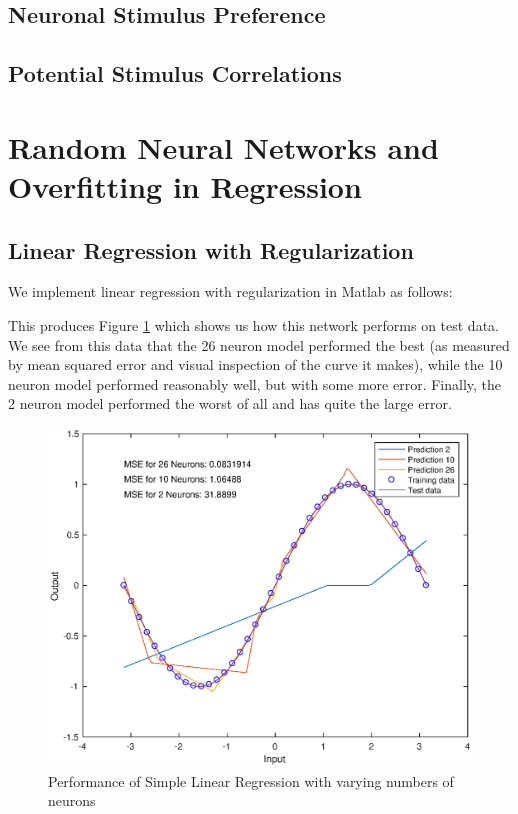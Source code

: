\documentclass[11pt, oneside]{article}
\begin{document}
\subsection{Neuronal Stimulus Preference}

\subsection{Potential Stimulus Correlations}

\section{Random Neural Networks and Overfitting in Regression}

\subsection{Linear Regression with Regularization}

We implement linear regression with regularization in Matlab as follows:

This produces Figure \ref{fig:regression} which shows us how this network performs on test data. We see from this data that the 26 neuron model performed the best (as measured by mean squared error and visual inspection of the curve it makes), while the 10 neuron model performed reasonably well, but with some more error. Finally, the 2 neuron model performed the worst of all and has quite the large error.

\begin{figure}[ht!]
\includegraphics[width=1\textwidth]{Q2PartA.eps}
\caption{Performance of Simple Linear Regression with varying numbers of neurons}
\label{fig:regression}
\end{figure}
\end{document}
